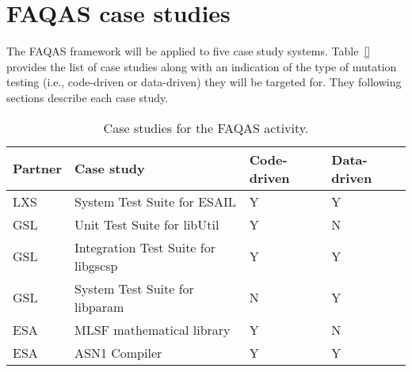 
\chapter{FAQAS case studies}
\label{chapter:caseStudies}

The FAQAS framework will be applied to five case study systems. Table~\ref{} provides the list of case studies along with an indication of the type of mutation testing (i.e., code-driven or data-driven) they will be targeted for. They following sections describe each case study.

\begin{table}[htp]
\caption{Case studies for the FAQAS activity.}
\label{tab:caseStudies}
\begin{center}
\begin{tabular}{|p{1cm}|p{6cm}|p{2.5cm}|p{2.5cm}}
\hline
\textbf{Partner}&\textbf{Case study}&\textbf{Code-driven}&\textbf{Data-driven}\\
\hline
LXS&System Test Suite for ESAIL&Y&Y\\
GSL&Unit Test Suite for libUtil&Y&N\\
GSL&Integration Test Suite for libgscsp&Y&Y\\
GSL&System Test Suite for libparam&N&Y\\
ESA&MLSF mathematical library&Y&N\\
ESA&ASN1 Compiler&Y&Y\\
\hline
\end{tabular}
\end{center}
\end{table}%




\clearpage










